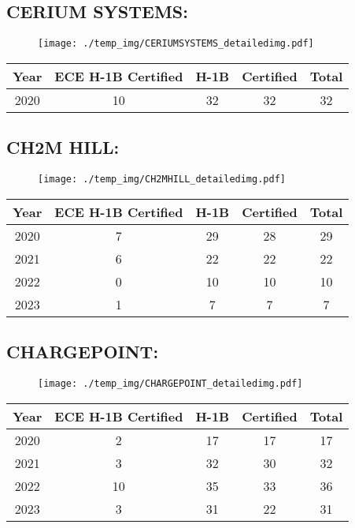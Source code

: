 \documentclass{article}%
\begin{document}
%
\newpage%
\subsection{CERIUM SYSTEMS:}%
\label{subsec:CERIUMSYSTEMS}%
\label{CERIUMSYSTEMSdetailed}%


\begin{figure}[htbp]%
\centering%
\texttt{[image: ./temp\_img/CERIUMSYSTEMS\_detailedimg.pdf]}%
\end{figure}

%
\begin{longtable}{c|c|c|c|c}%
\hline%
Year&ECE H{-}1B Certified&H{-}1B&Certified&Total\\%
\hline%
2020&10&32&32&32\\%
\hline%
\end{longtable}

%
\newpage%
\subsection{CH2M HILL:}%
\label{subsec:CH2MHILL}%
\label{CH2MHILLdetailed}%


\begin{figure}[htbp]%
\centering%
\texttt{[image: ./temp\_img/CH2MHILL\_detailedimg.pdf]}%
\end{figure}

%
\begin{longtable}{c|c|c|c|c}%
\hline%
Year&ECE H{-}1B Certified&H{-}1B&Certified&Total\\%
\hline%
2020&7&29&28&29\\%
\hline%
2021&6&22&22&22\\%
\hline%
2022&0&10&10&10\\%
\hline%
2023&1&7&7&7\\%
\hline%
\end{longtable}

%
\newpage%
\subsection{CHARGEPOINT:}%
\label{subsec:CHARGEPOINT}%
\label{CHARGEPOINTdetailed}%


\begin{figure}[htbp]%
\centering%
\texttt{[image: ./temp\_img/CHARGEPOINT\_detailedimg.pdf]}%
\end{figure}

%
\begin{longtable}{c|c|c|c|c}%
\hline%
Year&ECE H{-}1B Certified&H{-}1B&Certified&Total\\%
\hline%
2020&2&17&17&17\\%
\hline%
2021&3&32&30&32\\%
\hline%
2022&10&35&33&36\\%
\hline%
2023&3&31&22&31\\%
\hline%
\end{longtable}
\end{document}
